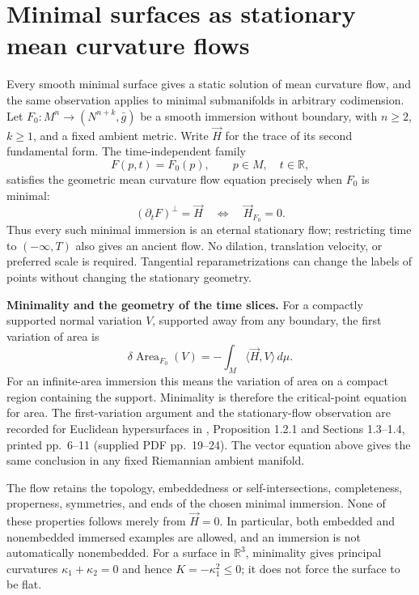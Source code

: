 \chapter{Minimal surfaces as stationary mean curvature flows}\label{sec:catalogue-stationary-catenoid}
\begin{example}\label{ex:catalogue-stationary-catenoid}
Every smooth minimal surface gives a static solution of mean curvature flow, and the same observation applies to minimal submanifolds in arbitrary codimension. Let $F_0:M^n\to (N^{n+k},\bar g)$ be a smooth immersion without boundary, with $n\geq2$, $k\geq1$, and a fixed ambient metric. Write $\vec H$ for the trace of its second fundamental form. The time-independent family
\[
 F(p,t)=F_0(p),\qquad p\in M,\quad t\in\mathbb R,
\]
satisfies the geometric mean curvature flow equation precisely when $F_0$ is minimal:
\[
 (\partial_tF)^\perp=\vec H
 \quad\Longleftrightarrow\quad \vec H_{F_0}=0.
\]
Thus every such minimal immersion is an eternal stationary flow; restricting time to $(-\infty,T)$ also gives an ancient flow. No dilation, translation velocity, or preferred scale is required. Tangential reparametrizations can change the labels of points without changing the stationary geometry.

\textbf{Minimality and the geometry of the time slices.}
For a compactly supported normal variation $V$, supported away from any boundary, the first variation of area is
\[
 \delta\operatorname{Area}_{F_0}(V)=-\int_M\langle\vec H,V\rangle\,d\mu.
\]
For an infinite-area immersion this means the variation of area on a compact region containing the support. Minimality is therefore the critical-point equation for area. The first-variation argument and the stationary-flow observation are recorded for Euclidean hypersurfaces in \cite{CatMan11}, Proposition 1.2.1 and Sections 1.3--1.4, printed pp.~6--11 (supplied PDF pp.~19--24). The vector equation above gives the same conclusion in any fixed Riemannian ambient manifold.

The flow retains the topology, embeddedness or self-intersections, completeness, properness, symmetries, and ends of the chosen minimal immersion. None of these properties follows merely from $\vec H=0$. In particular, both embedded and nonembedded immersed examples are allowed, and an immersion is not automatically nonembedded. For a surface in $\mathbb R^3$, minimality gives principal curvatures $\kappa_1+\kappa_2=0$ and hence $K=-\kappa_1^2\leq0$; it does not force the surface to be flat.


\end{example}
